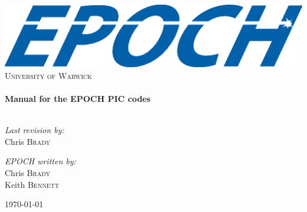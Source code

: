 \begin{titlepage}
 
\begin{center}
 
\includegraphics[width=14cm]{./images/EPOCHLogo.eps}\\[1cm]

\textsc{\LARGE University of Warwick}\\[1.5cm]
  
\HRule \\[0.4cm]
{ \huge \bfseries Manual for the EPOCH PIC codes}\\[0.4cm]
 
\HRule \\[1.5cm]
 
\begin{minipage}{0.4\textwidth}
\begin{flushleft} \large
\emph{Last revision by:}\\
Chris \textsc{Brady}
\end{flushleft}
\end{minipage}
\begin{minipage}{0.4\textwidth}
\begin{flushright} \large
\emph{EPOCH written by:} \\
Chris \textsc{Brady}\\
Keith \textsc{Bennett}\\
\end{flushright}
\end{minipage}
 
\vfill
 
{\large \today}
 
\end{center}
 
\end{titlepage}
